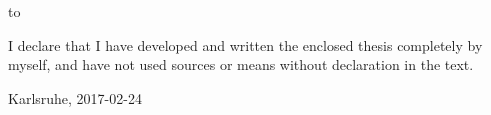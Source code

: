 \thispagestyle{empty}
\vspace*{40\baselineskip}
\hbox to \textwidth{\hrulefill}
\par
I declare that I have developed and written the enclosed thesis completely by myself, and
have not used sources or means without declaration in the text.

\vspace{2cm}

Karlsruhe, 2017-02-24



\clearpage






